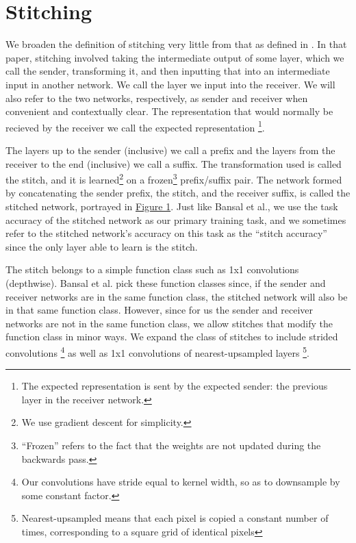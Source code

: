\documentclass{article} %
\begin{document}
\section{Stitching}
\label{Stitching}
We broaden the definition of stitching very little from that as defined in \cite{Bansal2021RevisitingMS}. In that paper,
stitching involved taking the intermediate output of some layer, which we call the sender, transforming it, and then
inputting that into an intermediate input in another network. We call the layer we input into the receiver. We
will also refer to the two networks, respectively, as sender and receiver when convenient and contextually clear.
The representation that would normally be recieved by the receiver we call the expected representation
\footnote{The expected representation is sent by
the expected sender: the previous layer in the receiver network.}.

The layers up to the sender (inclusive) we call a prefix and the layers from the receiver to the end (inclusive) we call
a suffix. The transformation used is called the stitch, and it is learned\footnote{We use gradient descent for simplicity.}
on a frozen\footnote{``Frozen'' refers to the fact that the weights are not updated during the backwards pass.}
prefix/suffix pair. The network formed by concatenating the sender prefix, the stitch, and the receiver
suffix, is called the stitched network, portrayed in \hyperref[Figure1]{Figure 1}. Just like Bansal et al., we
use the task accuracy of the stitched network as our
primary training task, and we sometimes refer to the stitched network's accuracy on this task as the ``stitch accuracy'' since
the only layer able to learn is the stitch.

The stitch belongs to a simple function class such as 1x1 convolutions (depthwise).
Bansal et al. pick these function classes since, if the sender and receiver networks are in the same
function class, the stitched network will also be in that same function class. However, since for us the sender and
receiver networks are not in the same function class, we allow stitches that modify the function class in minor ways.
We expand the class of stitches to include strided convolutions
\footnote{Our convolutions have stride equal to kernel width, so as to downsample
by some constant factor.} as well as 1x1 convolutions of nearest-upsampled layers
\footnote{Nearest-upsampled means that each pixel
is copied a constant number of times, corresponding to a square grid of identical pixels}.
\end{document}
